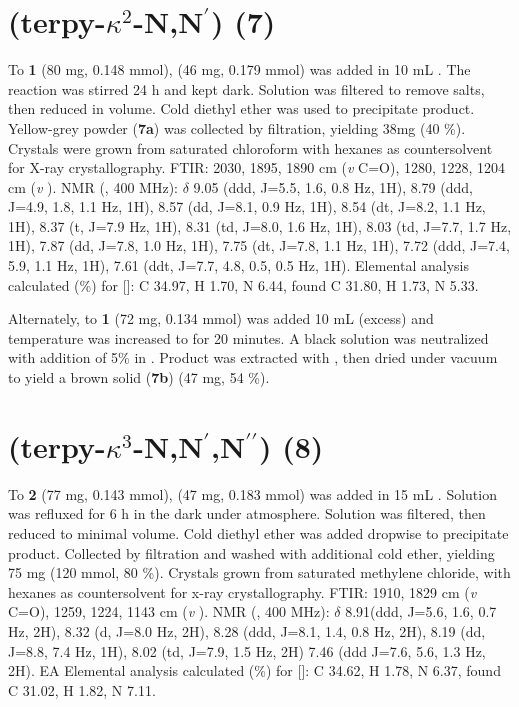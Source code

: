 \section{(terpy-$\kappa^2$-N,N$^\prime$) (7)}\label{sec.c7}
To \textbf{1} (80 mg, 0.148 mmol),  (46 mg, 0.179 mmol) was added in 10 mL . The reaction was stirred 24 h and kept dark. Solution was filtered to remove salts, then reduced in volume. Cold diethyl ether was used to precipitate product. Yellow-grey powder (\textbf{7a}) was collected by filtration, yielding 38mg (40 \%). Crystals were grown from saturated chloroform with hexanes as countersolvent for X-ray crystallography. FTIR: 2030, 1895, 1890 cm (\textit{v} C=O), 1280, 1228, 1204 cm (\textit{v} ).  NMR (, 400 MHz): $\delta$ 9.05 (ddd, J=5.5, 1.6, 0.8 Hz, 1H), 8.79 (ddd, J=4.9, 1.8, 1.1 Hz, 1H), 8.57 (dd, J=8.1, 0.9 Hz, 1H), 8.54 (dt, J=8.2, 1.1 Hz, 1H), 8.37 (t, J=7.9 Hz, 1H), 8.31 (td, J=8.0, 1.6 Hz, 1H), 8.03 (td, J=7.7, 1.7 Hz, 1H), 7.87 (dd, J=7.8, 1.0 Hz, 1H), 7.75 (dt, J=7.8, 1.1 Hz, 1H), 7.72 (ddd, J=7.4, 5.9, 1.1 Hz, 1H), 7.61 (ddt, J=7.7, 4.8, 0.5, 0.5 Hz, 1H).  Elemental analysis calculated (\%) for []: C 34.97, H 1.70, N 6.44, found C 31.80, H 1.73, N 5.33.

Alternately, to \textbf{1} (72 mg, 0.134 mmol) was added 10 mL  (excess) and temperature was increased to  for 20 minutes. A black solution was neutralized with addition of 5\%  in . Product was extracted with , then dried under vacuum to yield a brown solid (\textbf{7b}) (47 mg, 54 \%).

\section{(terpy-$\kappa^3$-N,N$^\prime$,N$^{\prime \prime}$) (8)}\label{sec.c8}
To \textbf{2} (77 mg,  0.143 mmol),  (47 mg,  0.183 mmol) was added in 15 mL . Solution was refluxed for 6 h in the dark under  atmosphere. Solution was filtered, then reduced to minimal volume. Cold diethyl ether was added dropwise to precipitate product. Collected by filtration and washed with additional cold ether, yielding 75 mg (120 mmol, 80 \%).  Crystals grown from saturated methylene chloride, with hexanes as countersolvent for x-ray crystallography. FTIR: 1910, 1829 cm (\textit{v} C=O), 1259, 1224, 1143 cm (\textit{v} ).  NMR (, 400 MHz): $\delta$ 8.91(ddd, J=5.6, 1.6, 0.7 Hz, 2H), 8.32 (d, J=8.0 Hz, 2H), 8.28 (ddd, J=8.1, 1.4, 0.8 Hz, 2H), 8.19 (dd, J=8.8, 7.4 Hz, 1H), 8.02 (td, J=7.9, 1.5 Hz, 2H) 7.46 (ddd J=7.6, 5.6, 1.3 Hz, 2H).  EA Elemental analysis calculated (\%) for []: C 34.62, H 1.78, N 6.37, found C 31.02, H 1.82, N 7.11.


